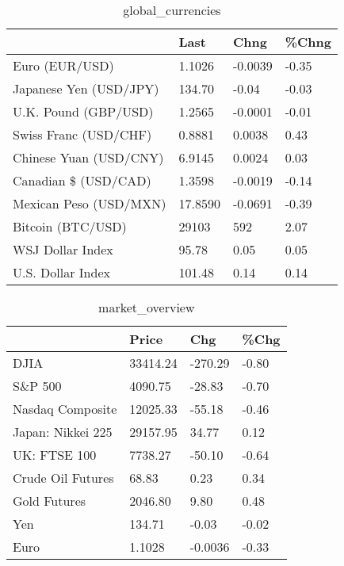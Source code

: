 \documentclass{article}%
\begin{document}
%


\begin{table}[htbp]%
\caption{global\_currencies}%
\centering%
\begin{adjustbox}{width=1\textwidth}%
\begin{tabular}{llll}
\toprule
                       &    Last &    Chng & \%Chng \\
\midrule
        Euro (EUR/USD) &  1.1026 & -0.0039 & -0.35 \\
Japanese Yen (USD/JPY) &  134.70 &   -0.04 & -0.03 \\
  U.K. Pound (GBP/USD) &  1.2565 & -0.0001 & -0.01 \\
 Swiss Franc (USD/CHF) &  0.8881 &  0.0038 &  0.43 \\
Chinese Yuan (USD/CNY) &  6.9145 &  0.0024 &  0.03 \\
  Canadian \$ (USD/CAD) &  1.3598 & -0.0019 & -0.14 \\
Mexican Peso (USD/MXN) & 17.8590 & -0.0691 & -0.39 \\
     Bitcoin (BTC/USD) &   29103 &     592 &  2.07 \\
      WSJ Dollar Index &   95.78 &    0.05 &  0.05 \\
     U.S. Dollar Index &  101.48 &    0.14 &  0.14 \\
\bottomrule
\end{tabular}
%
\end{adjustbox}%
\end{table}

%


\begin{table}[htbp]%
\caption{market\_overview}%
\centering%
\begin{adjustbox}{width=1\textwidth}%
\begin{tabular}{llll}
\toprule
                  &    Price &     Chg &  \%Chg \\
\midrule
             DJIA & 33414.24 & -270.29 & -0.80 \\
          S\&P 500 &  4090.75 &  -28.83 & -0.70 \\
 Nasdaq Composite & 12025.33 &  -55.18 & -0.46 \\
Japan: Nikkei 225 & 29157.95 &   34.77 &  0.12 \\
     UK: FTSE 100 &  7738.27 &  -50.10 & -0.64 \\
Crude Oil Futures &    68.83 &    0.23 &  0.34 \\
     Gold Futures &  2046.80 &    9.80 &  0.48 \\
              Yen &   134.71 &   -0.03 & -0.02 \\
             Euro &   1.1028 & -0.0036 & -0.33 \\
\bottomrule
\end{tabular}
%
\end{adjustbox}%
\end{table}

%
\end{document}
